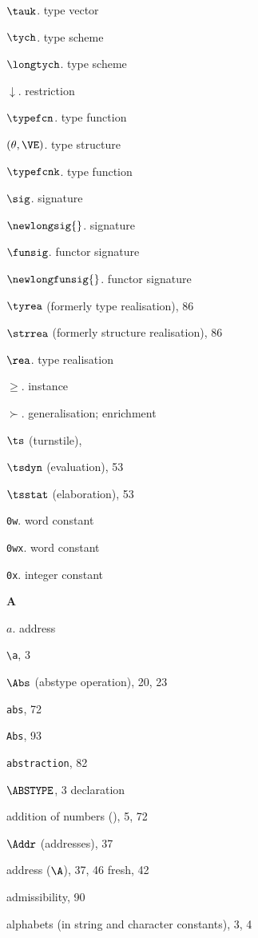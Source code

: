 \begin{theindex}
\item $\tauk$. \see type vector
\item $\tych$. \see type scheme
\item $\longtych$. \see type scheme
\item $\downarrow$. \see restriction
\item $\typefcn$. \see type function
\item $(\theta,\VE)$. \see type structure
\item $\typefcnk$. \see type function
\item $\sig$. \see signature
\item $\newlongsig{}$. \see signature
\item $\funsig$. \see functor signature
\item $\newlongfunsig{}$. \see functor signature
\item $\tyrea$ (formerly type realisation), 86
\item $\strrea$ (formerly structure realisation), 86
\item $\rea$. \see type realisation
\item $\geq$. \see instance
\item $\succ$. \see generalisation; enrichment
\item $\ts$ (turnstile), \tsrefs
\item $\tsdyn$ (evaluation), 53
\item $\tsstat$ (elaboration), 53
\item {\tt 0w}. \see word constant
\item {\tt 0wx}. \see word constant
\item {\tt 0x}. \see integer constant
\indexspace
\parbox{65mm}{\hfil{\large\bf A}\hfil}
\indexspace
\item $a$. \see address
\item \verb+\a+, 3
\item $\Abs$ (abstype operation), 20, 23
\item {\tt abs}, 72
\item {\tt Abs}, 93
\item {\tt abstraction}, 82
\item $\ABSTYPE$, 3
\subitem \seealso declaration
\item addition of numbers (\ml{+}), 5, 72
\item $\Addr$ (addresses), 37
\item address ($\A$), 37, 46
\subitem fresh, 42
\item admissibility, 90
\item alphabets (in string and character constants), 3, 4

\end{theindex}
